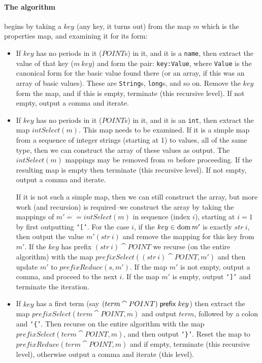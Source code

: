 \documentclass[a4paper,twoside,12pt]{article}
\begin{document}
\paragraph{The algorithm} begins by taking a $key$ (any key, it turns out) from the map $m$ which is the properties map, and examining it for its form:
\begin{itemize}

\item If $key$ has no periods in it ($POINT$s) in it, and it is a \texttt{name}, then extract the value of that key ($m ~ key$) and form the pair: \texttt{key:Value}, where \texttt{Value} is the canonical form for the basic value found there (or an array, if this was an array of basic values). These are \texttt{String}s, \texttt{long}s, and so on. Remove the $key$ form the map, and if this is empty, terminate (this recursive level). If not empty, output a comma and iterate.

\item If $key$ has no periods in it ($POINT$s) in it, and it is an \texttt{int}, then extract the map $intSelect(m)$. This map needs to be examined. If it is a simple map from a sequence of integer strings (starting at 1) to values, all of the same type, then we can construct the array of these values as output. The $intSelect(m)$ mappings may be removed from $m$ before proceeding. If the resulting map is empty then terminate (this recursive level). If not empty, output a comma and iterate.

If it is not such a simple map, then we can still construct the array, but more work (and recursion) is required--we construct the array by taking the mappings of $m' == intSelect(m)$ in sequence (index $i$), starting at $i=1$ by first outputting \texttt{`['}.
For the case $i$, if the 
$key \in \mathop{\mathrm{dom}} m'$ is exactly $str~i$, then output the value $m' (str~i)$ and remove the mapping for this key from $m'$. If the $key$ has prefix $(str~i) \cat POINT$ we recurse (on the entire algorithm) with the map $prefixSelect((str~i)\cat POINT, m')$ and then update $m'$ to $prefixReduce(s,m')$. If the map $m'$ is not empty, output a comma, and proceed to the next $i$. If the map $m'$ is empty, output \texttt{`]'} and terminate the iteration.

\item If $key$ has a first term (say $(term \cat POINT)\prefix key$) then extract the map $prefixSelect(term \cat POINT, m)$ and output $term$, followed by a colon and \texttt{`\{'}. Then recurse on the entire algorithm with the map $prefixSelect(term \cat POINT, m)$, and then output  \texttt{`\}'}. Reset the map to $prefixReduce(term \cat POINT, m)$ and if empty, terminate (this recursive level), otherwise output a comma and iterate (this level).
\end{itemize}
\end{document}

